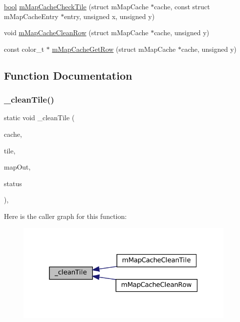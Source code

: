 \begin{DoxyCompactItemize}
\item 
\mbox{\hyperlink{libretro_8h_a4a26dcae73fb7e1528214a068aca317e}{bool}} \mbox{\hyperlink{map-cache_8c_a15867a8857e1045680838b22ad9ccc61}{m\+Map\+Cache\+Check\+Tile}} (struct m\+Map\+Cache $\ast$cache, const struct m\+Map\+Cache\+Entry $\ast$entry, unsigned x, unsigned y)
\item 
void \mbox{\hyperlink{map-cache_8c_a0a1c74da99590ece390c102cb8b9b742}{m\+Map\+Cache\+Clean\+Row}} (struct m\+Map\+Cache $\ast$cache, unsigned y)
\item 
const color\+\_\+t $\ast$ \mbox{\hyperlink{map-cache_8c_a90311ee29890fde2be10354bfb527898}{m\+Map\+Cache\+Get\+Row}} (struct m\+Map\+Cache $\ast$cache, unsigned y)
\end{DoxyCompactItemize}


\subsection{Function Documentation}
\mbox{\label{map-cache_8c_ae4693b20d148d7eaa2403672db789c01}} 
\subsubsection{\texorpdfstring{\+\_\+clean\+Tile()}{\_cleanTile()}}
{\footnotesize\ttfamily static void \+\_\+clean\+Tile (\begin{DoxyParamCaption}\item[{struct m\+Map\+Cache $\ast$}]{cache,  }\item[{const color\+\_\+t $\ast$}]{tile,  }\item[{color\+\_\+t $\ast$}]{map\+Out,  }\item[{const struct m\+Map\+Cache\+Entry $\ast$}]{status }\end{DoxyParamCaption})\hspace{0.3cm}{\ttfamily [inline]}, {\ttfamily [static]}}

Here is the caller graph for this function\+:
\nopagebreak
\begin{figure}[H]
\begin{center}
\leavevmode
\includegraphics[width=307pt]{map-cache_8c_ae4693b20d148d7eaa2403672db789c01_icgraph}
\end{center}
\end{figure}
\mbox{\label{map-cache_8c_a5409e1d298b34a1384ad3b76fab685c5}} 
